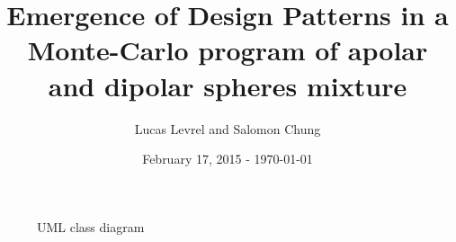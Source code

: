 \documentclass{article}
\title{Emergence of Design Patterns in a Monte-Carlo program of 
    apolar and dipolar spheres mixture}
\author{Lucas Levrel and Salomon Chung}
\date{February 17, 2015 - \today{}}
\begin{document}
\maketitle

    \begin{figure}[htb]
        \centering
        
        \caption{UML class diagram}
    \end{figure}
\end{document}
